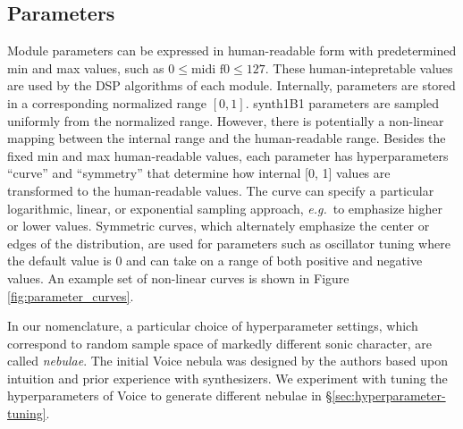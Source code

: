 \subsection{Parameters}
Module parameters can be expressed in human-readable form with predetermined min and max values, such as $0 \le \textrm{midi f0} \le 127$. These human-intepretable values are used by the DSP algorithms of each module.
Internally, parameters are stored in a corresponding normalized range $[0, 1]$. synth1B1 parameters are sampled uniformly from the normalized range. However, there is potentially a non-linear mapping between the internal range and the human-readable range. Besides the fixed min and max human-readable values, each parameter has hyperparameters ``curve'' and ``symmetry'' that determine how internal [0, 1] values are transformed to the human-readable values. The curve can specify a particular logarithmic, linear, or exponential sampling approach, {\em e.g.}\ to emphasize higher or lower values. Symmetric curves, which alternately emphasize the center or edges of the distribution, are used for parameters such as oscillator tuning where the default value is 0 and can take on a range of both positive and negative values. An example set of non-linear curves is shown in Figure \ref{fig:parameter_curves}.

In our nomenclature, a particular choice of hyperparameter settings, which correspond to random sample space of markedly different sonic character, are called {\em nebulae}. The initial Voice nebula was designed by the authors based upon intuition and prior experience with synthesizers. We experiment with tuning the hyperparameters of Voice to generate different nebulae in \S\ref{sec:hyperparameter-tuning}.








